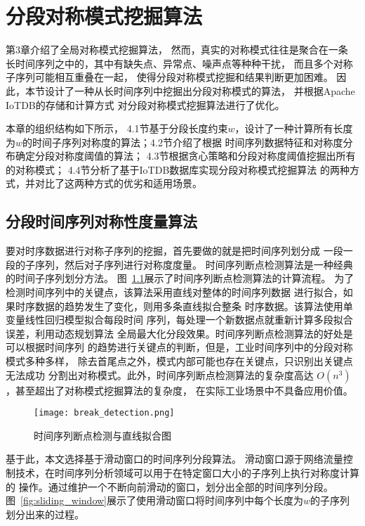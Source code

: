 
\chapter{分段对称模式挖掘算法}
第3章介绍了全局对称模式挖掘算法，
然而，真实的对称模式往往是聚合在一条
长时间序列之中的，其中有缺失点、异常点、噪声点等种种干扰，
而且多个对称子序列可能相互重叠在一起，
使得分段对称模式挖掘和结果判断更加困难。
因此，本节设计了一种从长时间序列中挖掘出分段对称模式的算法，
并根据Apache IoTDB的存储和计算方式
对分段对称模式挖掘算法进行了优化。

本章的组织结构如下所示，
4.1节基于分段长度约束$w$，设计了一种计算所有长度
为$w$的时间子序列对称度的算法；4.2节介绍了根据
时间序列数据特征和对称度分布确定分段对称度阈值的算法；
4.3节根据贪心策略和分段对称度阈值挖掘出所有的对称模式；
4.4节分析了基于IoTDB数据库实现分段对称模式挖掘算法
的两种方式，并对比了这两种方式的优劣和适用场景。

\section{分段时间序列对称性度量算法}
要对时序数据进行对称子序列的挖掘，首先要做的就是把时间序列划分成
一段一段的子序列，然后对子序列进行对称度度量。
时间序列断点检测算法是一种经典的时间子序列划分方法\cite{DBLP:conf/igarss/UrbanHZMGBMMFRH21}。
图~\ref{fig:break_detection}展示了时间序列断点检测算法的计算流程。
为了检测时间序列中的关键点，该算法采用直线对整体的时间序列数据
进行拟合，如果时序数据的趋势发生了变化，则用多条直线拟合整条
时序数据。该算法使用单变量线性回归模型拟合每段时间
序列，每处理一个新数据点就重新计算多段拟合误差，利用动态规划算法
全局最大化分段效果。时间序列断点检测算法的好处是可以根据时间序列
的趋势进行关键点的判断，但是，工业时间序列中的分段对称模式多种多样，
除去首尾点之外，模式内部可能也存在关键点，只识别出关键点无法成功
分割出对称模式。此外，时间序列断点检测算法的复杂度高达
$O\left(n^{3}\right)$，甚至超出了对称模式挖掘算法的复杂度，
在实际工业场景中不具备应用价值。
\begin{figure}[t]
  \centering
  \texttt{[image: break\_detection.png]}
  \caption{时间序列断点检测与直线拟合图}
  \label{fig:break_detection}
\end{figure}

基于此，本文选择基于滑动窗口的时间序列分段算法\cite{DBLP:conf/pkdd/LestiS17}。
滑动窗口源于网络流量控制技术，在时间序列分析领域可以用于在特定窗口大小的子序列上执行对称度计算的
操作。通过维护一个不断向前滑动的窗口，划分出全部的时间序列分段。
图~\ref{fig:sliding_window}展示了使用滑动窗口将时间序列中每个长度为$w$的子序列划分出来的过程。

